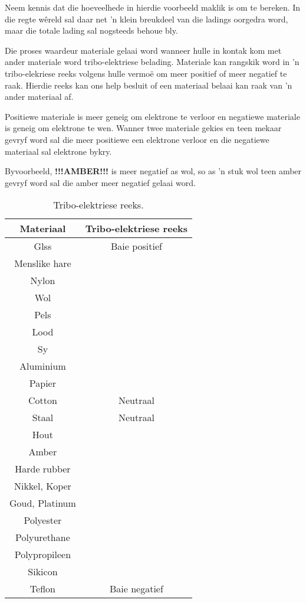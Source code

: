 \begin{minipage}{.35\textwidth}

Neem kennis dat die hoeveelhede in hierdie voorbeeld maklik is om te bereken. In die regte w\^ereld sal daar net 'n klein breukdeel van die ladings oorgedra word, maar die totale lading sal nogsteeds behoue bly. \par

Die proses waardeur materiale gelaai word wanneer hulle in kontak kom met ander materiale word tribo-elektriese belading. Materiale kan rangskik word in 'n tribo-elekriese reeks volgens hulle vermo\"e om meer positief of meer negatief te raak. Hierdie reeks kan ons help besluit of een materiaal belaai kan raak van 'n ander materiaal af.

Positiewe materiale is meer geneig om elektrone te verloor en negatiewe materiale is geneig om elektrone te wen. Wanner twee materiale gekies en teen mekaar gevryf word sal die meer positiewe een elektrone verloor en die negatiewe materiaal sal elektrone bykry.

Byvoorbeeld, \textbf{!!!AMBER!!! } is meer negatief as wol, so as 'n stuk wol teen amber gevryf word sal die amber meer negatief gelaai word.
\end{minipage}
\begin{minipage}{.55\textwidth}
\begin{center}
\begin{table}[H]
\centering
\begin{tabular}{|cc|}\hline
\textbf{Materiaal}&\textbf{Tribo-elektriese reeks}\\\hline
Glss& Baie positief\\\hline
Menslike hare&\\\hline
Nylon&\\\hline
Wol&\\\hline
Pels&\\\hline
Lood&\\\hline
Sy&\\\hline
Aluminium&\\\hline
Papier&\\\hline
Cotton&Neutraal\\\hline
Staal &Neutraal\\\hline
Hout&\\\hline
Amber&\\\hline
Harde rubber&\\\hline
Nikkel, Koper&\\\hline
Goud, Platinum&\\\hline
Polyester&\\\hline
Polyurethane&\\\hline
Polypropileen&\\\hline
Sikicon&\\\hline
Teflon& Baie negatief\\\hline
\end{tabular}
\caption{Tribo-elektriese reeks.}
\end{table}
\end{center}
\end{minipage}

